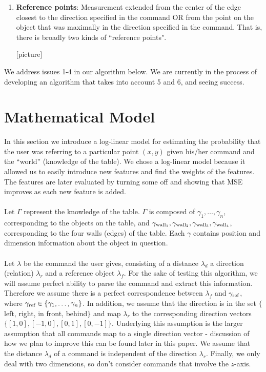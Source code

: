\documentclass[12pt,letterpaper]{article}
\newcommand\refobj{\textmd{ref}}
\begin{document}
\begin{enumerate}[(1)]
\item \textbf{Reference points}: Measurement extended from the center of the edge closest to the direction specified in the command OR from the point on the object that was maximally in the direction specified in the command. That is, there is broadly two kinds of ``reference points".

[picture]
\end{enumerate}

We address issues 1-4 in our algorithm below. We are currently in the process of developing an algorithm that takes into account 5 and 6, and seeing success.


\section{Mathematical Model}
In this section we introduce a log-linear model for estimating the probability that the user was referring to a particular point $(x, y)$ given his/her command and the ``world'' (knowledge of the table). We chose a log-linear model because it allowed us to easily introduce new features and find the weights of the features. The features are later evaluated by turning some off and showing that MSE improves as each new feature is added. \\
\\
Let $\Gamma$ represent the knowledge of the table. $\Gamma$ is composed of $\gamma_1, \ldots, \gamma_n$, corresponding to the objects on the table, and $\gamma_{\textmd{wall}_1}, \gamma_{\textmd{wall}_2}, \gamma_{\textmd{wall}_3}, \gamma_{\textmd{wall}_4}$, corresponding to the four walls (edges) of the table. Each $\gamma$ contains position and dimension information about the object in question.   \\
\\
Let $\lambda$ be the command the user gives, consisting of a distance $\lambda_d$ a direction (relation) $\lambda_r$ and a reference object $\lambda_f$. For the sake of testing this algorithm, we will assume perfect ability to parse the command and extract this information. Therefore we assume there is a perfect correspondence between $\lambda_f$ and $\gamma_\refobj$, where $\gamma_\refobj \in \{\gamma_1, \ldots, \gamma_n\}$. In addition, we assume that the direction is in the set $\{$left, right, in front, behind$\}$ and map $\lambda_r$ to the corresponding direction vectors $\{[1, 0], [-1, 0], [0, 1], [0, -1]\}$.  Underlying this assumption is the larger assumption that all commands map to a single direction vector - discussion of how we plan to improve this can be found later in this paper. We assume that the distance $\lambda_d$ of a command is independent of the direction $\lambda_r$. Finally, we only deal with two dimensions, so don't consider commands that involve the $z$-axis. \\
\end{document}
